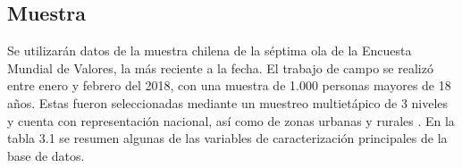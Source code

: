 \documentclass[12pt,twoside]{templates/facsothesis}
\begin{document}
\hypertarget{muestra}{%
\subsection{Muestra}\label{muestra}}

\FloatBarrier

Se utilizarán datos de la muestra chilena de la séptima ola de la Encuesta Mundial de Valores, la más reciente a la fecha. El trabajo de campo se realizó entre enero y febrero del 2018, con una muestra de 1.000 personas mayores de 18 años. Estas fueron seleccionadas mediante un muestreo multietápico de 3 niveles y cuenta con representación nacional, así como de zonas urbanas y rurales \citep{haerpfer2020}. En la tabla 3.1 se resumen algunas de las variables de caracterización principales de la base de datos.
\end{document}
